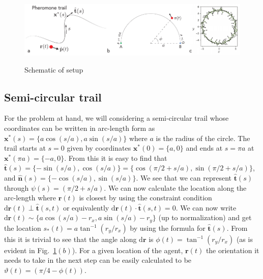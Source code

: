 \documentclass[12pt]{article}
\def\d{\text{d}}
\def\r{\mathbf{r}}
\def\xst{\mathbf{x}^*}
\def\th{\hat{\mathbf{t}}}
\def\nh{\hat{\mathbf{n}}}
\def\theta{\vartheta}
\begin{document}
\begin{figure}
    \centering
    \includegraphics[width=\textwidth]{./figs/schematic.pdf}\label{fig:schm1}
    \caption{Schematic of setup}
\end{figure}

\subsection{Semi-circular trail}
For the problem at hand, we will considering a semi-circular trail whose coordinates can be
written in arc-length form as $\xst(s) = \{ a \cos(s/a), a \sin(s/a) \}$ where $a$ is the radius
of the circle. The trail starts at $s=0$ given by coordinates $\xst(0) = \{ a, 0 \}$ and ends at
$s=\pi a$ at $\xst (\pi a) = \{ -a, 0 \}$. From this it is easy to find that $\th(s) = \{ -\sin(s/a) , \cos(s/a) \}
= \{ \cos(\pi/2 + s/a), \sin(\pi/2 + s/a) \}$, and $\nh(s) = \{ -\cos(s/a) , \sin(s/a) \}$. We see that we
can represent $\th(s)$ through $\psi(s) = (\pi/2 + s/a)$. We can now calculate the location along the arc-length
where $\r(t)$ is closest by using the constraint condition $\d\r(t) \perp \th(s,t)$ or equivalently $\d\r(t)
\cdot \th(s,t) = 0$. We can now write $\d \r(t) \sim \{ a \cos(s/a) - r_x, a \sin(s/a) - r_y \}$
(up to normalization) and get the location $s_*(t) = a \tan^{-1}(r_y/r_x)$ by using the formula
for $\th(s)$. From this it is trivial to see that the angle along $\d \r$ is $\phi(t) = \tan^{-1}(r_y/r_x)$
(as is evident in Fig.~\ref{fig:schm1}$(b)$). For a given location of the agent, $\r(t)$ the orientation
it needs to take in the next step can be easily calculated to be $\theta(t) = (\pi/4 - \phi(t))$.
\end{document}
